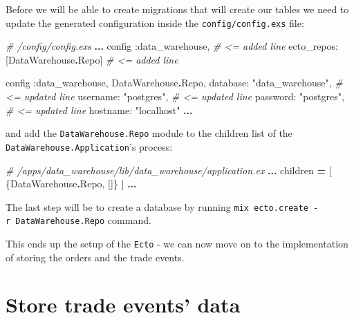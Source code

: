 \documentclass[
]{book}
\newenvironment{Shaded}{\begin{snugshade}}{\end{snugshade}}
\newcommand{\CommentTok}[1]{\textcolor[rgb]{0.56,0.35,0.01}{\textit{#1}}}
\newcommand{\ConstantTok}[1]{\textcolor[rgb]{0.00,0.00,0.00}{#1}}
\newcommand{\NormalTok}[1]{#1}
\newcommand{\OperatorTok}[1]{\textcolor[rgb]{0.81,0.36,0.00}{\textbf{#1}}}
\newcommand{\StringTok}[1]{\textcolor[rgb]{0.31,0.60,0.02}{#1}}
\newcommand{\VariableTok}[1]{\textcolor[rgb]{0.00,0.00,0.00}{#1}}
\begin{document}
Before we will be able to create migrations that will create our tables we need to update the generated configuration inside the \texttt{config/config.exs} file:

\begin{Shaded}
\begin{Highlighting}[]
\CommentTok{\# /config/config.exs}
\OperatorTok{...}
\NormalTok{config }\VariableTok{:data\_warehouse}\NormalTok{,            }\CommentTok{\# \textless{}= added line}
  \VariableTok{ecto\_repos:}\NormalTok{ [}\ConstantTok{DataWarehouse}\OperatorTok{.}\ConstantTok{Repo}\NormalTok{] }\CommentTok{\# \textless{}= added line}

\NormalTok{config }\VariableTok{:data\_warehouse}\NormalTok{, }\ConstantTok{DataWarehouse}\OperatorTok{.}\ConstantTok{Repo}\NormalTok{,}
  \VariableTok{database:} \StringTok{"data\_warehouse"}\NormalTok{, }\CommentTok{\# \textless{}= updated line}
  \VariableTok{username:} \StringTok{"postgres"}\NormalTok{,       }\CommentTok{\# \textless{}= updated line}
  \VariableTok{password:} \StringTok{"postgres"}\NormalTok{,       }\CommentTok{\# \textless{}= updated line}
  \VariableTok{hostname:} \StringTok{"localhost"}
\OperatorTok{...}
\end{Highlighting}
\end{Shaded}

and add the \texttt{DataWarehouse.Repo} module to the children list of the \texttt{DataWarehouse.Application}'s process:

\begin{Shaded}
\begin{Highlighting}[]
    \CommentTok{\# /apps/data\_warehouse/lib/data\_warehouse/application.ex}
    \OperatorTok{...}
\NormalTok{    children }\OperatorTok{=}\NormalTok{ [}
\NormalTok{      \{}\ConstantTok{DataWarehouse}\OperatorTok{.}\ConstantTok{Repo}\NormalTok{, []\}}
\NormalTok{    ]}
    \OperatorTok{...}
\end{Highlighting}
\end{Shaded}

The last step will be to create a database by running \texttt{mix\ ecto.create\ -r\ DataWarehouse.Repo} command.

This ends up the setup of the \texttt{Ecto} - we can now move on to the implementation of storing the orders and the trade events.

\hypertarget{store-trade-events-data}{%
\section{Store trade events' data}\label{store-trade-events-data}}
\end{document}
